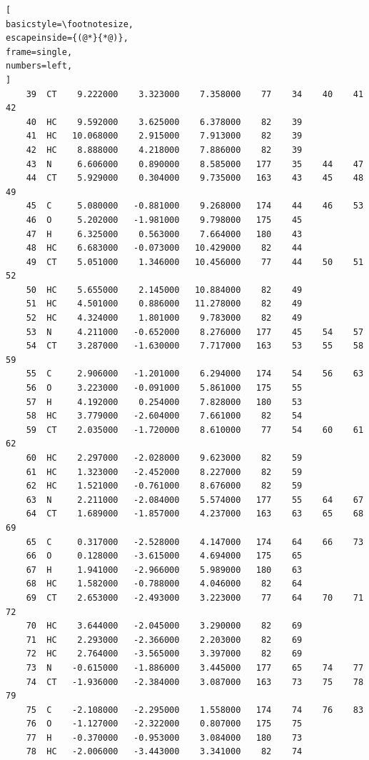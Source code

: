 \documentclass[a4paper,11pt]{scrartcl}
\begin{document}
\begin{lstlisting}[
basicstyle=\footnotesize,
escapeinside={(@*}{*@)},
frame=single,
numbers=left,
]
    39  CT    9.222000    3.323000    7.358000    77    34    40    41    42
    40  HC    9.592000    3.625000    6.378000    82    39
    41  HC   10.068000    2.915000    7.913000    82    39
    42  HC    8.888000    4.218000    7.886000    82    39
    43  N     6.606000    0.890000    8.585000   177    35    44    47
    44  CT    5.929000    0.304000    9.735000   163    43    45    48    49
    45  C     5.080000   -0.881000    9.268000   174    44    46    53
    46  O     5.202000   -1.981000    9.798000   175    45
    47  H     6.325000    0.563000    7.664000   180    43
    48  HC    6.683000   -0.073000   10.429000    82    44
    49  CT    5.051000    1.346000   10.456000    77    44    50    51    52
    50  HC    5.655000    2.145000   10.884000    82    49
    51  HC    4.501000    0.886000   11.278000    82    49
    52  HC    4.324000    1.801000    9.783000    82    49
    53  N     4.211000   -0.652000    8.276000   177    45    54    57
    54  CT    3.287000   -1.630000    7.717000   163    53    55    58    59
    55  C     2.906000   -1.201000    6.294000   174    54    56    63
    56  O     3.223000   -0.091000    5.861000   175    55
    57  H     4.192000    0.254000    7.828000   180    53
    58  HC    3.779000   -2.604000    7.661000    82    54
    59  CT    2.035000   -1.720000    8.610000    77    54    60    61    62
    60  HC    2.297000   -2.028000    9.623000    82    59
    61  HC    1.323000   -2.452000    8.227000    82    59
    62  HC    1.521000   -0.761000    8.676000    82    59
    63  N     2.211000   -2.084000    5.574000   177    55    64    67
    64  CT    1.689000   -1.857000    4.237000   163    63    65    68    69
    65  C     0.317000   -2.528000    4.147000   174    64    66    73
    66  O     0.128000   -3.615000    4.694000   175    65
    67  H     1.941000   -2.966000    5.989000   180    63
    68  HC    1.582000   -0.788000    4.046000    82    64
    69  CT    2.653000   -2.493000    3.223000    77    64    70    71    72
    70  HC    3.644000   -2.045000    3.290000    82    69
    71  HC    2.293000   -2.366000    2.203000    82    69
    72  HC    2.764000   -3.565000    3.397000    82    69
    73  N    -0.615000   -1.886000    3.445000   177    65    74    77
    74  CT   -1.936000   -2.384000    3.087000   163    73    75    78    79
    75  C    -2.108000   -2.295000    1.558000   174    74    76    83
    76  O    -1.127000   -2.322000    0.807000   175    75
    77  H    -0.370000   -0.953000    3.084000   180    73
    78  HC   -2.006000   -3.443000    3.341000    82    74

\end{lstlisting}
\end{document}

